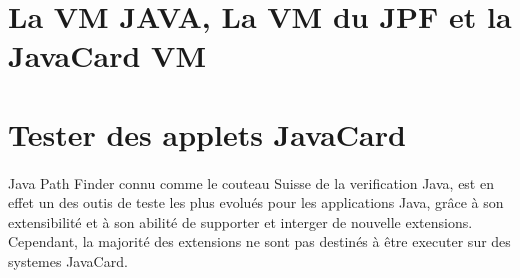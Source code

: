   \section{La VM JAVA, La VM du JPF et la JavaCard VM}
  \section{Tester des applets JavaCard}
  \paragraph{}
    Java Path Finder connu comme le couteau Suisse de la verification Java,
    est en effet un des outis de teste les plus evolués pour les applications Java,
    grâce à son extensibilité et à son abilité de supporter et interger de nouvelle extensions.
    Cependant, la majorité des extensions ne sont pas destinés à être executer sur des systemes JavaCard.